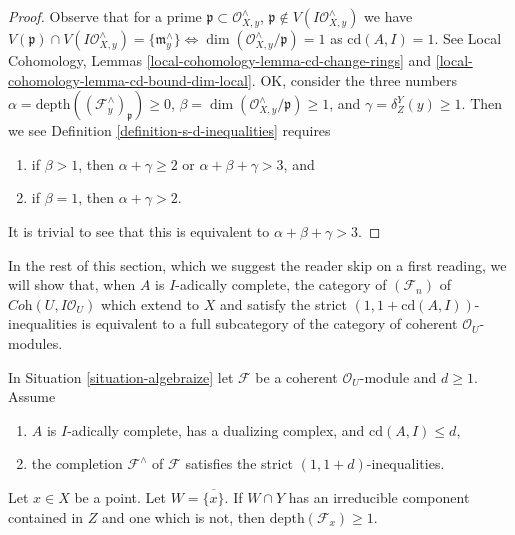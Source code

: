 \begin{proof}
Observe that for a prime $\mathfrak p \subset \mathcal{O}_{X, y}^\wedge$,
$\mathfrak p \not \in V(I\mathcal{O}_{X, y}^\wedge)$
we have $V(\mathfrak p) \cap V(I\mathcal{O}_{X, y}^\wedge) =
\{\mathfrak m_y^\wedge\}
\Leftrightarrow \dim(\mathcal{O}_{X, y}^\wedge/\mathfrak p) = 1$
as $\text{cd}(A, I) = 1$.
See Local Cohomology, Lemmas
\ref{local-cohomology-lemma-cd-change-rings} and
\ref{local-cohomology-lemma-cd-bound-dim-local}.
OK, consider the three numbers
$\alpha = \text{depth}((\mathcal{F}^\wedge_y)_\mathfrak p) \geq 0$,
$\beta = \dim(\mathcal{O}_{X, y}^\wedge/\mathfrak p) \geq 1$, and
$\gamma = \delta^Y_Z(y) \geq 1$.
Then we see Definition \ref{definition-s-d-inequalities} requires
\begin{enumerate}
\item if $\beta > 1$, then
$\alpha + \gamma \geq 2$ or $\alpha + \beta + \gamma > 3$, and
\item if $\beta = 1$, then $\alpha + \gamma > 2$.
\end{enumerate}
It is trivial to see that this is equivalent to
$\alpha + \beta + \gamma > 3$.
\end{proof}

\noindent
In the rest of this section, which we suggest the reader skip on a first
reading, we will show that, when $A$ is $I$-adically complete,
the category of $(\mathcal{F}_n)$ of $\textit{Coh}(U, I\mathcal{O}_U)$
which extend to $X$ and satisfy the
strict $(1, 1 + \text{cd}(A, I))$-inequalities
is equivalent to a full subcategory of the category of coherent
$\mathcal{O}_U$-modules.

\begin{lemma}
\label{lemma-sanity}
In Situation \ref{situation-algebraize} let $\mathcal{F}$ be a
coherent $\mathcal{O}_U$-module and $d \geq 1$. Assume
\begin{enumerate}
\item $A$ is $I$-adically complete, has a dualizing complex, and
$\text{cd}(A, I) \leq d$,
\item the completion $\mathcal{F}^\wedge$ of $\mathcal{F}$
satisfies the strict $(1, 1 + d)$-inequalities.
\end{enumerate}
Let $x \in X$ be a point. Let $W = \overline{\{x\}}$.
If $W \cap Y$ has an irreducible component contained in $Z$
and one which is not, then $\text{depth}(\mathcal{F}_x) \geq 1$.
\end{lemma}

